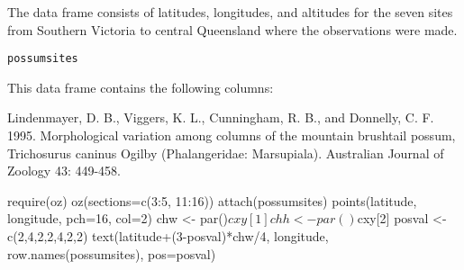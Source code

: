 \begin{Description}\relax
The  data frame consists of latitudes, longitudes,
and altitudes for the seven sites from Southern Victoria to central Queensland
where the  observations were made.
\end{Description}
\begin{Usage}
\begin{verbatim}possumsites\end{verbatim}
\end{Usage}
\begin{Format}\relax
This data frame contains the following columns:
\end{Format}
\begin{Source}\relax
Lindenmayer, D. B., Viggers, K. L., Cunningham, R. B., and
Donnelly, C. F. 1995. Morphological variation among columns of the
mountain brushtail possum, Trichosurus caninus Ogilby
(Phalangeridae: Marsupiala). Australian Journal of Zoology 43:
449-458.
\end{Source}
\begin{Examples}
\begin{ExampleCode}
require(oz)
oz(sections=c(3:5, 11:16))
attach(possumsites)
points(latitude, longitude, pch=16, col=2)
chw <- par()$cxy[1]
chh <- par()$cxy[2]
posval <- c(2,4,2,2,4,2,2)
text(latitude+(3-posval)*chw/4, longitude, row.names(possumsites), pos=posval)
\end{ExampleCode}
\end{Examples}

